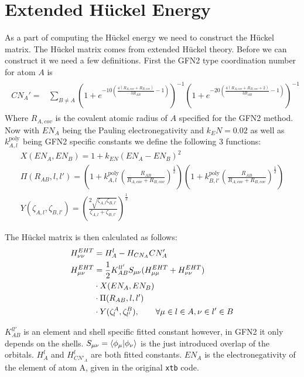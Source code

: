 \section{Extended Hückel Energy}
As a part of computing the Hückel energy we need to construct the Hückel matrix.
The Hückel matrix comes from extended Hückel theory. Before we can construct it we need a few definitions. 
First the GFN2 type coordination number for atom $A$ is
\begin{gather}
    \begin{split}
        CN_A' = &\sum_{B\neq A}\left(1+e^{-10\left(\frac{4\left(R_{A,cov}+R_{B,cov}\right)}{3R_{AB}}-1\right)}\right)^{-1}\left(1+e^{-20\left(\frac{4\left(R_{A,cov}+R_{B,cov}+2\right)}{3R_{AB}}-1\right)}\right)^{-1}
    \end{split}
\end{gather}
Where $R_{A,cov}$ is the covalent atomic radius of $A$ specified for the GFN2 method.
Now with $EN_A$ being the Pauling electronegativity and $k_EN=0.02$ as well as $k_{A,l}^{\text{poly}}$ being GFN2 specific constants we define the following 3 functions:
\begin{gather}
    X(EN_A,EN_B) = 1 + k_{EN}(EN_A-EN_B)^2\\
    \Pi(R_{AB},l,l') = \left(1 + k^{\text{poly}}_{A,l}\left(\frac{R_{AB}}{R_{A,cov}+R_{B,cov}}\right)^\frac{1}{2}\right)\left(1 + k^{\text{poly}}_{B,l'}\left(\frac{R_{AB}}{R_{A,cov}+R_{B,cov}}\right)^\frac{1}{2}\right)\\
    Y(\zeta_{A,l},\zeta_{B,l'}) = \left(\frac{2\sqrt{\zeta_{A,l}\zeta_{B,l'}}}{\zeta_{A,l}+\zeta_{B,l'}}\right)^\frac{1}{2}
\end{gather}

The Hückel matrix is then calculated as follows:
\begin{align}
    H_{\nu\nu}^{EHT} &= H_A^l - H_{CN_A}CN_A'\\
    H^{EHT}_{\mu\nu} &= \frac{1}{2}K^{ll'}_{AB}S_{\mu\nu}(H^{EHT}_{\mu\mu}+H^{EHT}_{\nu\nu})\\
    &\cdot X(EN_A,EN_B)\notag\\
    &\cdot \Pi(R_{AB},l,l')\notag\\
    &\cdot Y(\zeta^A_l,\zeta^B_{l'}), \quad\quad \forall \mu \in l \in A, \nu \in l' \in B\notag
\end{align}

$K^{ll'}_{AB}$ is an element and shell specific fitted constant however, in GFN2 it only depends on the shells. 
$S_{\mu\nu}=\braket{\phi_\mu|\phi_\nu}$ is the just introduced overlap of the orbitals. 
$H^l_A$ and $H^l_{CN'_A}$ are both fitted constants. $EN_A$ is the electronegativity of the element of atom A, given in the original \texttt{xtb} code. 

